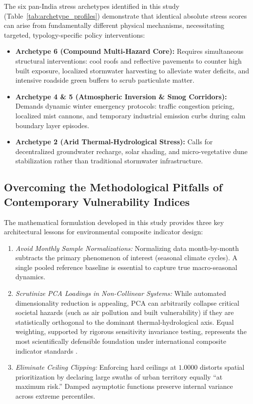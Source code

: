 The six pan-India stress archetypes identified in this study (Table~\ref{tab:archetype_profiles}) demonstrate that identical absolute stress scores can arise from fundamentally different physical mechanisms, necessitating targeted, typology-specific policy interventions:
\begin{itemize}
    \item \textbf{Archetype 6 (Compound Multi-Hazard Core):} Requires simultaneous structural interventions: cool roofs and reflective pavements to counter high built exposure, localized stormwater harvesting to alleviate water deficits, and intensive roadside green buffers to scrub particulate matter.
    \item \textbf{Archetype 4 \& 5 (Atmospheric Inversion \& Smog Corridors):} Demands dynamic winter emergency protocols: traffic congestion pricing, localized mist cannons, and temporary industrial emission curbs during calm boundary layer episodes.
    \item \textbf{Archetype 2 (Arid Thermal-Hydrological Stress):} Calls for decentralized groundwater recharge, solar shading, and micro-vegetative dune stabilization rather than traditional stormwater infrastructure.
\end{itemize}

\subsection{Overcoming the Methodological Pitfalls of Contemporary Vulnerability Indices}
The mathematical formulation developed in this study provides three key architectural lessons for environmental composite indicator design:
\begin{enumerate}
    \item \textit{Avoid Monthly Sample Normalizations:} Normalizing data month-by-month subtracts the primary phenomenon of interest (seasonal climate cycles). A single pooled reference baseline is essential to capture true macro-seasonal dynamics.
    \item \textit{Scrutinize PCA Loadings in Non-Collinear Systems:} While automated dimensionality reduction is appealing, PCA can arbitrarily collapse critical societal hazards (such as air pollution and built vulnerability) if they are statistically orthogonal to the dominant thermal-hydrological axis. Equal weighting, supported by rigorous sensitivity invariance testing, represents the most scientifically defensible foundation under international composite indicator standards \citep{oecd2008handbook}.
    \item \textit{Eliminate Ceiling Clipping:} Enforcing hard ceilings at $1.0000$ distorts spatial prioritization by declaring large swaths of urban territory equally ``at maximum risk.'' Damped asymptotic functions preserve internal variance across extreme percentiles.
\end{enumerate}

